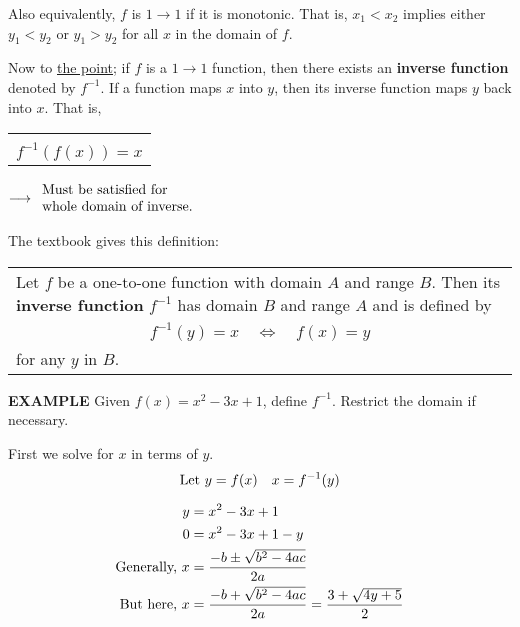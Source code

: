 \documentclass{article}
\begin{document}
Also equivalently, $f$ is $1\to1$ if it is monotonic. That is, $x_1<x_2$ implies either $y_1<y_2$ or $y_1>y_2$ for all $x$ in the domain of $f$.

\vspace{10pt}

Now to \underline{the point}; if $f$ is a $1\to1$ function, then there exists an {\bf{}inverse function} denoted by $f^{-1}$. If a function maps $x$ into $y$, then its inverse function maps $y$ back into $x$. That is,

\begin{center}
\begin{tabular}{|c|}
\hline\\
$f^{-1}(f(x))=x$\\[1em]
\hline
\end{tabular}
$\longrightarrow\begin{array}{l}\textnormal{Must be satisfied for}\\ \textnormal{whole domain of inverse.}\end{array}$
\end{center}

The textbook gives this definition:

\vspace{10pt}

\begin{tabularx}{\textwidth}{|X|}
\cline{1-1}\\
Let $f$ be a one-to-one function with domain $A$ and range $B$. Then its {\bf{}inverse function} $f^{-1}$ has domain $B$ and range $A$ and is defined by\\[2em]
\multicolumn{1}{|c|}{$f^{-1}(y)=x\quad\Longleftrightarrow\quad f(x)=y$}\\[0.5em]
for any $y$ in $B$.\\[1em]
\cline{1-1}
\end{tabularx}

\vspace{10pt}

{\bf{}EXAMPLE} Given $f(x)=x^2-3x+1$, define $f^{-1}$. Restrict the domain if necessary.

\vspace{10pt}

First we solve for $x$ in terms of $y$. \[\textnormal{Let }y=f(x)\quad x=f^{-1}(y)\]

\begin{align*}
y&=x^2-3x+1\\
0&=x^2-3x+1-y\\
\textnormal{Generally, }x&=\frac{-b\pm\sqrt{b^2-4ac}}{2a}\\
\textnormal{But here, }x&=\frac{-b+\sqrt{b^2-4ac}}{2a}=\frac{3+\sqrt{4y+5}}{2}
\end{align*}
\end{document}
